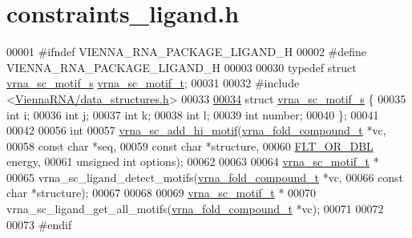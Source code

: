 \hypertarget{constraints__ligand_8h_source}{}\section{constraints\+\_\+ligand.\+h}
\label{constraints__ligand_8h_source}

\begin{DoxyCode}
00001 \textcolor{preprocessor}{#ifndef VIENNA\_RNA\_PACKAGE\_LIGAND\_H}
00002 \textcolor{preprocessor}{#define VIENNA\_RNA\_PACKAGE\_LIGAND\_H}
00003 
00030 \textcolor{keyword}{typedef} \textcolor{keyword}{struct }\hyperlink{structvrna__sc__motif__s}{vrna\_sc\_motif\_s} \hyperlink{structvrna__sc__motif__s}{vrna\_sc\_motif\_t};
00031 
00032 \textcolor{preprocessor}{#include <\hyperlink{data__structures_8h}{ViennaRNA/data\_structures.h}>}
00033 
\hyperlink{structvrna__sc__motif__s}{00034} \textcolor{keyword}{struct }\hyperlink{structvrna__sc__motif__s}{vrna\_sc\_motif\_s} \{
00035   \textcolor{keywordtype}{int} i;
00036   \textcolor{keywordtype}{int} j;
00037   \textcolor{keywordtype}{int} k;
00038   \textcolor{keywordtype}{int} l;
00039   \textcolor{keywordtype}{int} number;
00040 \};
00041 
00042 
00056 \textcolor{keywordtype}{int}
00057 \hyperlink{group__constraints__ligand_gaa6ff0113a3a76dc0b8d62961f4e1dfa0}{vrna\_sc\_add\_hi\_motif}(\hyperlink{group__fold__compound_structvrna__fc__s}{vrna\_fold\_compound\_t} *vc,
00058                      \textcolor{keyword}{const} \textcolor{keywordtype}{char}           *seq,
00059                      \textcolor{keyword}{const} \textcolor{keywordtype}{char}           *structure,
00060                      \hyperlink{group__data__structures_ga31125aeace516926bf7f251f759b6126}{FLT\_OR\_DBL}           energy,
00061                      \textcolor{keywordtype}{unsigned} \textcolor{keywordtype}{int}         options);
00062 
00063 
00064 \hyperlink{structvrna__sc__motif__s}{vrna\_sc\_motif\_t} *
00065 vrna\_sc\_ligand\_detect\_motifs(\hyperlink{group__fold__compound_structvrna__fc__s}{vrna\_fold\_compound\_t} *vc,
00066                              \textcolor{keyword}{const} \textcolor{keywordtype}{char}           *structure);
00067 
00068 
00069 \hyperlink{structvrna__sc__motif__s}{vrna\_sc\_motif\_t} *
00070 vrna\_sc\_ligand\_get\_all\_motifs(\hyperlink{group__fold__compound_structvrna__fc__s}{vrna\_fold\_compound\_t} *vc);
00071 
00072 
00073 \textcolor{preprocessor}{#endif}
\end{DoxyCode}
